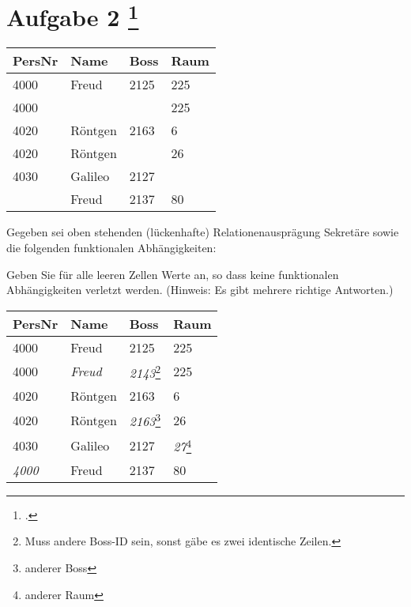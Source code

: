 \documentclass{lehramt-informatik-aufgabe}
\begin{document}
\section{Aufgabe 2
\footcite{examen:66116:2020:03}}

\begin{center}
\begin{tabular}{|l|l|l|l|}
\hline
PersNr & Name    & Boss & Raum \\\hline
4000   & Freud   & 2125 & 225 \\\hline
4000   &         &      & 225 \\\hline
4020   & Röntgen & 2163 & 6 \\\hline
4020   & Röntgen &      & 26 \\\hline
4030   & Galileo & 2127 & \\\hline
       & Freud   & 2137 & 80 \\\hline
\end{tabular}
\end{center}

\noindent
Gegeben sei oben stehenden (lückenhafte) Relationenausprägung Sekretäre
sowie die folgenden funktionalen Abhängigkeiten:

\begin{center}

\end{center}

\noindent
Geben Sie für alle leeren Zellen Werte an, so dass keine funktionalen
Abhängigkeiten verletzt werden. (Hinweis: Es gibt mehrere richtige
Antworten.)

\begin{liAntwort}
\begin{center}
\begin{tabular}{|l|l|l|l|}
\hline
PersNr & Name    & Boss & Raum \\\hline
4000   & Freud   & 2125 & 225 \\\hline
4000   & \textit{Freud}   & \textit{2143}\footnote{Muss andere Boss-ID
sein, sonst gäbe es zwei identische Zeilen.} & 225 \\\hline
4020   & Röntgen & 2163 & 6 \\\hline
4020   & Röntgen & \textit{2163}\footnote{anderer Boss} & 26 \\\hline
4030   & Galileo & 2127 & \textit{27}\footnote{anderer Raum} \\\hline
\textit{4000}   & Freud   & 2137 & 80 \\\hline
\end{tabular}
\end{center}
\end{liAntwort}
\end{document}
